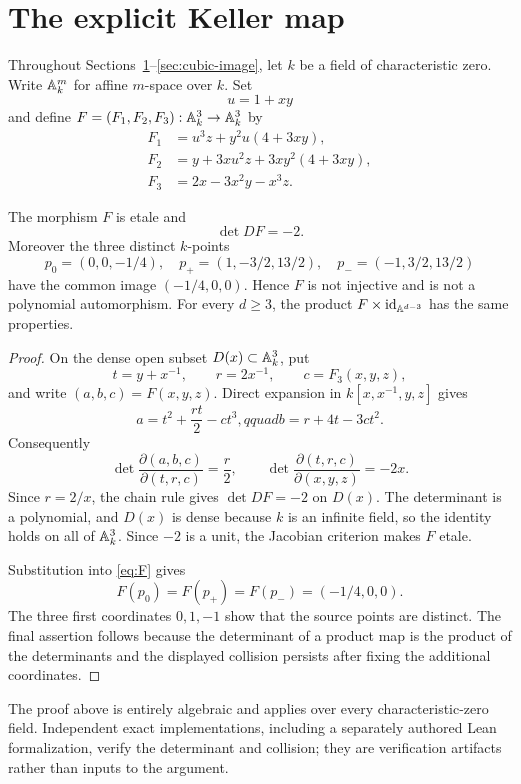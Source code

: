 \section{The explicit Keller map}\label{sec:explicit}

Throughout Sections~\ref{sec:explicit}--\ref{sec:cubic-image}, let $k$ be a
field of characteristic zero.  Write $\mathbb A^m_k$ for affine $m$-space over $k$.
Set
\[
 u=1+xy
\]
and define $F=(F_1,F_2,F_3):\mathbb A^3_k\to\mathbb A^3_k$ by
\begin{align}
F_1&=u^3z+y^2u(4+3xy),\nonumber\\
F_2&=y+3xu^2z+3xy^2(4+3xy),\label{eq:F}\\
F_3&=2x-3x^2y-x^3z.\nonumber
\end{align}

\begin{theorem}\label{thm:counterexample}
The morphism $F$ is etale and
\[
 \det DF=-2.
\]
Moreover the three distinct $k$-points
\[
p_0=(0,0,-1/4),\quad p_+=(1,-3/2,13/2),\quad
p_-=(-1,3/2,13/2)
\]
have the common image $(-1/4,0,0)$.  Hence $F$ is not injective and is not a
polynomial automorphism.  For every $d\ge3$, the product
$F\times\operatorname{id}_{\mathbb A^{d-3}}$ has the same properties.
\end{theorem}

\begin{proof}
On the dense open subset $D(x)\subset\mathbb A^3_k$, put
\[
 t=y+x^{-1},\qquad r=2x^{-1},\qquad c=F_3(x,y,z),
\]
and write $(a,b,c)=F(x,y,z)$.  Direct expansion in
$k[x,x^{-1},y,z]$ gives
\begin{equation}\label{eq:trc-target}
 a=t^2+\frac{rt}{2}-ct^3,qquad b=r+4t-3ct^2.
\end{equation}
Consequently
\[
 \det\frac{\partial(a,b,c)}{\partial(t,r,c)}=\frac r2,
 \qquad
 \det\frac{\partial(t,r,c)}{\partial(x,y,z)}=-2x.
\]
Since $r=2/x$, the chain rule gives $\det DF=-2$ on $D(x)$.
The determinant is a polynomial, and $D(x)$ is dense because $k$ is an
infinite field, so the identity holds on all of $\mathbb A^3_k$.  Since $-2$ is a
unit, the Jacobian criterion makes $F$ etale.

Substitution into \eqref{eq:F} gives
\[
 F(p_0)=F(p_+)=F(p_-)=(-1/4,0,0).
\]
The three first coordinates $0,1,-1$ show that the source points are
distinct.  The final assertion follows because the determinant of a product
map is the product of the determinants and the displayed collision persists
after fixing the additional coordinates.
\end{proof}

The proof above is entirely algebraic and applies over every
characteristic-zero field.  Independent exact implementations, including a
separately authored Lean formalization, verify the determinant and collision;
they are verification artifacts rather than inputs to the argument.
